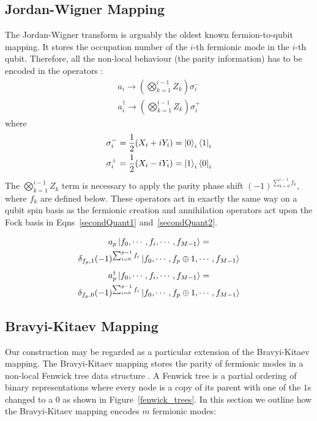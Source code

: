 \documentclass[pdftex,pra,aps,twocolumn,twoside]{revtex4-2}
\theoremstyle{plain}
\theoremstyle{note}
\newcommand\+{{\footnotesize \raisebox{0.3ex}{+}}}
\begin{document}
\subsection{Jordan-Wigner Mapping}
\label{section:jordan-wigner}
The Jordan-Wigner transform \cite{jordan1993paulische} is arguably the oldest known fermion-to-qubit mapping. It stores the occupation number of the $i$-th fermionic mode in the $i$-th qubit. Therefore, all the non-local behaviour (the parity information) has to be encoded in the operators \cite{chiew2021optimal}:
\begin{align}
        a_i \rightarrow \left( \bigotimes_{k=1}^{i-1} Z_k \right) \sigma_i^-\\
        a^{\dagger}_i \rightarrow \left( \bigotimes_{k=1}^{i-1} Z_k \right) \sigma_i^+
\end{align}
where
\begin{align}
        \sigma^-_i = \frac{1}{2} (X_i + i Y_i) = \ket{0}_i \bra{1}_i\\
        \sigma^+_i = \frac{1}{2} (X_i - i Y_i) = \ket{1}_i \bra{0}_i 
\end{align}
The $\bigotimes_{k=1}^{i-1} Z_k$ term is necessary to apply the parity phase shift $(-1)^{\sum_{k=0}^{i-1} f_k}$, where $f_k$ are defined below. These operators act in exactly the same way on a qubit spin basis as the fermionic creation and annihilation operators act upon the Fock basis in Eqns~\eqref{secondQuant1} and~\eqref{secondQuant2}.

\begin{multline}
    \label{secondQuant1}
    a_p \ket{f_0,\cdots, f_i, \cdots, f_{M-1}} =\\ \delta_{f_p, 1} (-1)^{\sum_{i=0}^{p-1} f_i} \ket{f_0,\cdots, f_p \oplus 1, \cdots, f_{M-1}}
    \end{multline}
\begin{multline}
    \label{secondQuant2}
    a_p^{\dagger} \ket{f_0,\cdots, f_i, \cdots, f_{M-1}} =\\ \delta_{f_p, 0} (-1)^{\sum_{i=0}^{p-1} f_i}
    \ket{f_0,\cdots, f_p \oplus 1, \cdots, f_{M-1}}
    \end{multline}
\subsection{Bravyi-Kitaev Mapping}
\label{section:bravyi-kitaev}
Our construction may be regarded as a particular extension of the Bravyi-Kitaev mapping. The Bravyi-Kitaev mapping stores the parity of fermionic modes in a non-local Fenwick tree data structure \cite{havlivcek2017operator}. A Fenwick tree \cite{fenwick1994new} is a partial ordering of binary representations where every node is a copy of its parent with one of the $1$s changed to a $0$ as shown in Figure~\ref{fenwick_trees}. In this section we outline how the Bravyi-Kitaev mapping encodes $m$ fermionic modes:
\end{document}
